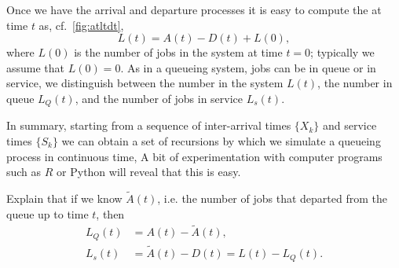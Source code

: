 Once we have the arrival and departure processes it is easy to compute the  at time $t$ as, cf.~\cref{fig:atltdt},
\begin{equation}\label{eq:14}
 L(t) = A(t) - D(t) + L(0),
\end{equation}
where $L(0)$ is the number of jobs in the system at time $t=0$; typically we assume that $L(0)=0$.
As in a queueing system, jobs can be in queue or in service, we distinguish between the number in the system $L(t)$, the number in queue $L_Q(t)$, and the number of jobs in service $L_s(t)$.


In summary, starting from a sequence of inter-arrival times $\{X_k\}$ and service times $\{S_k\}$ we can obtain a set of recursions by which we simulate a queueing process in continuous time, A bit of experimentation with computer programs such as $R$ or Python will reveal that this is easy.

\begin{extra}
 Explain that if we know $\tilde A(t)$, i.e.
 the number of jobs that departed from the queue up to time $t$, then
\begin{align*}
 L_Q(t) &= A(t) - \tilde A(t), \\
L_s(t) &= \tilde A(t) - D(t) = L(t) - L_Q(t).
\end{align*}
\begin{equation*}
\end{equation*}
\end{extra}



